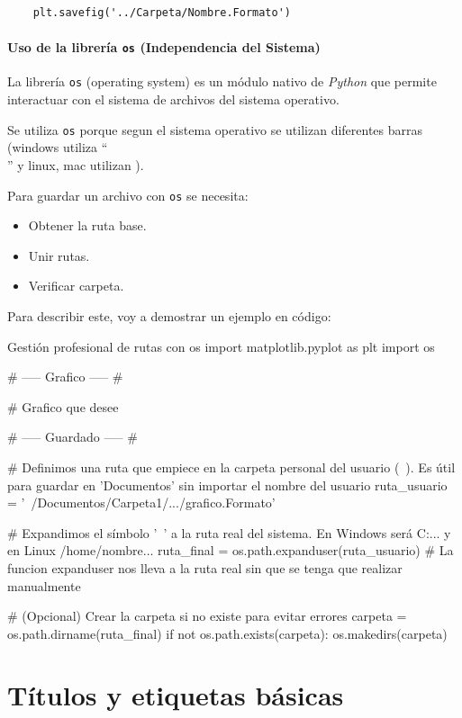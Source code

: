\begin{verbatim}
    plt.savefig('../Carpeta/Nombre.Formato')
\end{verbatim}


\paragraph{Uso de la librería \texttt{os} (Independencia del Sistema)}

La librería \texttt{os} (operating system) es un módulo nativo de \textit{Python} que permite interactuar con el sistema de archivos del sistema operativo.

Se utiliza \texttt{os} porque segun el sistema operativo se utilizan diferentes barras (windows utiliza ``\\'' y linux, mac utilizan \/). 

Para guardar un archivo con \texttt{os} se necesita:
\begin{itemize}
    \item Obtener la ruta base.
    \item Unir rutas.
    \item Verificar carpeta.
\end{itemize}

Para describir este, voy a demostrar un ejemplo en código:

\begin{pycode}{Gestión profesional de rutas con os}
import matplotlib.pyplot as plt
import os

# ----- Grafico ----- #

# Grafico que desee

# ----- Guardado ----- #

# Definimos una ruta que empiece en la carpeta personal del usuario (~). Es útil para guardar en 'Documentos' sin importar el nombre del usuario
ruta_usuario = '~/Documentos/Carpeta1/.../grafico.Formato'

# Expandimos el símbolo '~' a la ruta real del sistema. En Windows será C:\Users\Nombre... y en Linux /home/nombre...
ruta_final = os.path.expanduser(ruta_usuario)
# La funcion expanduser nos lleva a la ruta real sin que se tenga que realizar manualmente

# (Opcional) Crear la carpeta si no existe para evitar errores
carpeta = os.path.dirname(ruta_final)
if not os.path.exists(carpeta):
    os.makedirs(carpeta)
\end{pycode}



\section{Títulos y etiquetas básicas}

